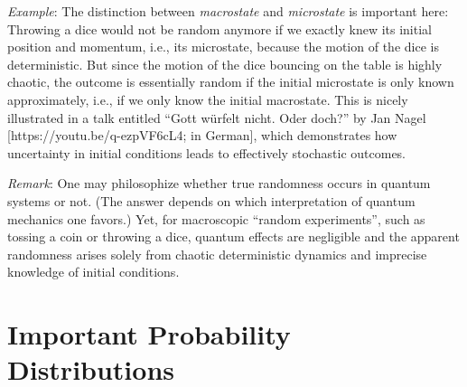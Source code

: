 \documentclass{notebook}
\makeatletter
\newcommand{\Remark}{\textit{Remark}} %
\newcommand{\Example}{\textit{Example}}
\makeatother
\begin{document}
\Example: 
The distinction between \textit{macrostate} and \textit{microstate} is important here: 
Throwing a dice would not be random anymore if we exactly knew its initial position and momentum, 
i.e., its microstate, because the motion of the dice is deterministic. 
But since the motion of the dice bouncing on the table is highly chaotic, 
the outcome is essentially random if the initial microstate is only known approximately, 
i.e., if we only know the initial macrostate.
This is nicely illustrated in a talk entitled 
``Gott w\"urfelt nicht. Oder doch?'' by Jan Nagel [https://youtu.be/q-ezpVF6cL4; in German], 
which demonstrates how uncertainty in initial conditions leads to effectively stochastic outcomes.

\Remark: 
One may philosophize whether true randomness occurs in quantum systems or not.
(The answer depends on which interpretation of quantum mechanics one favors.)
Yet, for macroscopic ``random experiments'', such as tossing a coin or throwing a dice, 
quantum effects are negligible and the apparent randomness arises solely from chaotic deterministic dynamics
and imprecise knowledge of initial conditions.


\section{Important Probability Distributions}
\end{document}
